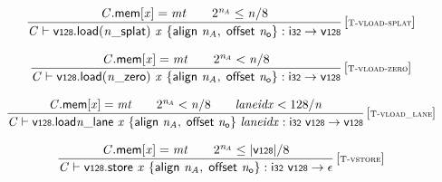 $$
\begin{array}{@{}c@{}}\displaystyle
\frac{
{\mathit{C}}.\mathsf{mem}{}[{\mathit{x}}] = {\mathit{mt}}
 \qquad
{2^{{\mathit{n}}_{{\mathit{A}}}}} \leq {\mathit{n}} / 8
}{
{\mathit{C}} \vdash {\mathsf{v{\scriptstyle128}.load}}{({{{\mathit{n}}}{\mathsf{\_}}}{\mathsf{splat}})}~{\mathit{x}}~\{ \begin{array}[t]{@{}l@{}}
\mathsf{align}~{\mathit{n}}_{{\mathit{A}}},\; \mathsf{offset}~{\mathit{n}}_{{\mathsf{o}}} \}\end{array} : \mathsf{i{\scriptstyle32}} \rightarrow \mathsf{v{\scriptstyle128}}
} \, {[\textsc{\scriptsize T{-}vload{-}splat}]}
\qquad
\end{array}
$$

$$
\begin{array}{@{}c@{}}\displaystyle
\frac{
{\mathit{C}}.\mathsf{mem}{}[{\mathit{x}}] = {\mathit{mt}}
 \qquad
{2^{{\mathit{n}}_{{\mathit{A}}}}} < {\mathit{n}} / 8
}{
{\mathit{C}} \vdash {\mathsf{v{\scriptstyle128}.load}}{({{{\mathit{n}}}{\mathsf{\_}}}{\mathsf{zero}})}~{\mathit{x}}~\{ \begin{array}[t]{@{}l@{}}
\mathsf{align}~{\mathit{n}}_{{\mathit{A}}},\; \mathsf{offset}~{\mathit{n}}_{{\mathsf{o}}} \}\end{array} : \mathsf{i{\scriptstyle32}} \rightarrow \mathsf{v{\scriptstyle128}}
} \, {[\textsc{\scriptsize T{-}vload{-}zero}]}
\qquad
\end{array}
$$

$$
\begin{array}{@{}c@{}}\displaystyle
\frac{
{\mathit{C}}.\mathsf{mem}{}[{\mathit{x}}] = {\mathit{mt}}
 \qquad
{2^{{\mathit{n}}_{{\mathit{A}}}}} < {\mathit{n}} / 8
 \qquad
{\mathit{laneidx}} < 128 / {\mathit{n}}
}{
{\mathit{C}} \vdash {{{\mathsf{v{\scriptstyle128}.load}}{{\mathit{n}}}}{\mathsf{\_}}}{\mathsf{lane}}~{\mathit{x}}~\{ \begin{array}[t]{@{}l@{}}
\mathsf{align}~{\mathit{n}}_{{\mathit{A}}},\; \mathsf{offset}~{\mathit{n}}_{{\mathsf{o}}} \}\end{array}~{\mathit{laneidx}} : \mathsf{i{\scriptstyle32}}~\mathsf{v{\scriptstyle128}} \rightarrow \mathsf{v{\scriptstyle128}}
} \, {[\textsc{\scriptsize T{-}vload\_lane}]}
\qquad
\end{array}
$$

$$
\begin{array}{@{}c@{}}\displaystyle
\frac{
{\mathit{C}}.\mathsf{mem}{}[{\mathit{x}}] = {\mathit{mt}}
 \qquad
{2^{{\mathit{n}}_{{\mathit{A}}}}} \leq {|\mathsf{v{\scriptstyle128}}|} / 8
}{
{\mathit{C}} \vdash \mathsf{v{\scriptstyle128}.store}~{\mathit{x}}~\{ \begin{array}[t]{@{}l@{}}
\mathsf{align}~{\mathit{n}}_{{\mathit{A}}},\; \mathsf{offset}~{\mathit{n}}_{{\mathsf{o}}} \}\end{array} : \mathsf{i{\scriptstyle32}}~\mathsf{v{\scriptstyle128}} \rightarrow \epsilon
} \, {[\textsc{\scriptsize T{-}vstore}]}
\qquad
\end{array}
$$

